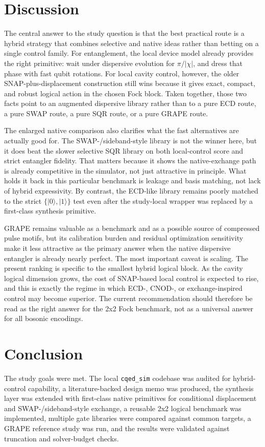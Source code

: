 \documentclass[11pt, a4paper]{article}
\begin{document}
\section{Discussion}
The central answer to the study question is that the best practical route is a
hybrid strategy that combines selective and native ideas rather than betting on
a single control family. For entanglement, the local device model already
provides the right primitive: wait under dispersive evolution for \(\pi/|\chi|\),
and dress that phase with fast qubit rotations. For local cavity control,
however, the older SNAP-plus-displacement construction still wins because it
gives exact, compact, and robust logical action in the chosen Fock block. Taken
together, those two facts point to an augmented dispersive library rather than
to a pure ECD route, a pure SWAP route, a pure SQR route, or a pure GRAPE route.

The enlarged native comparison also clarifies what the fast alternatives are
actually good for. The SWAP-/sideband-style library is not the winner here, but
it does beat the slower selective SQR library on both local-control score and
strict entangler fidelity. That matters because it shows the native-exchange
path is already competitive in the simulator, not just attractive in principle.
What holds it back in this particular benchmark is leakage and basis matching,
not lack of hybrid expressivity. By contrast, the ECD-like library remains
poorly matched to the strict \(\{|0\rangle,|1\rangle\}\) test even after the
study-local wrapper was replaced by a first-class synthesis primitive.

GRAPE remains valuable as a benchmark and as a possible source of compressed
pulse motifs, but its calibration burden and residual optimization sensitivity
make it less attractive as the primary answer when the native dispersive
entangler is already nearly perfect. The most important caveat is scaling. The
present ranking is specific to the smallest hybrid logical block. As the cavity
logical dimension grows, the cost of SNAP-based local control is expected to
rise, and this is exactly the regime in which ECD-, CNOD-, or exchange-inspired
control may become superior. The current recommendation should therefore be read
as the right answer for the 2x2 Fock benchmark, not as a universal answer for
all bosonic encodings.

\section{Conclusion}
The study goals were met. The local \texttt{cqed\_sim} codebase was audited for
hybrid-control capability, a literature-backed design memo was produced, the
synthesis layer was extended with first-class native primitives for conditional
displacement and SWAP-/sideband-style exchange, a reusable 2x2 logical
benchmark was implemented, multiple gate libraries were compared against common
targets, a GRAPE reference study was run, and the results were validated
against truncation and solver-budget checks.
\end{document}
